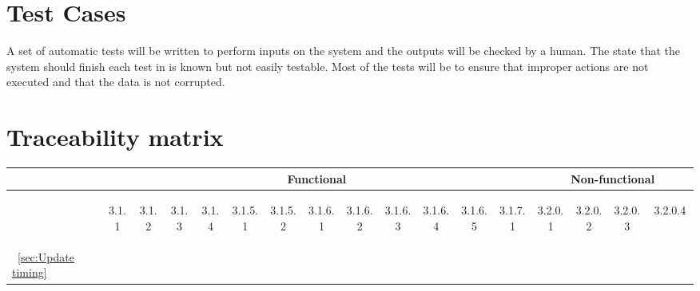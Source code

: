 \documentclass[12pt]{article}
\renewcommand{\c}{\checkmark}
\newcommand{\s}[1] {\begin{sideways}#1\end{sideways}}
\begin{document}
\section{Test Cases}
A set of automatic tests will be written to perform inputs on the system and the outputs will be checked by a human.  The state that the system should finish each test in is known but not easily testable.  Most of the tests will be to ensure that improper actions are not executed and that the data is not corrupted.


\section{Traceability matrix}
\begin{center}
\begin{tabular}{|l||*{12}{c|}|*{4}{c|}}
\hline
\multicolumn{1}{|c||}{ }&
\multicolumn{12}{|c||}{Functional} &
\multicolumn{4}{|c|}{Non-functional}\\
\hline
	& \s{3.1.1} & \s{3.1.2} & \s{3.1.3} & \s{3.1.4} & \s{3.1.5.1} & \s{3.1.5.2} & \s{3.1.6.1} & \s{3.1.6.2} & \s{3.1.6.3} & \s{3.1.6.4} & \s{3.1.6.5} & \s{3.1.7.1} & \s{3.2.0.1} & \s{3.2.0.2} & \s{3.2.0.3} & \s{3.2.0.4~~}\\
\hline
\hline
~\ref{sec:Update timing}	&	&	&	&	&	&	&	&	&	&	&	&	&\c	&	&	&	\\
\hline
\end{tabular}
\end{center}
\end{document}
